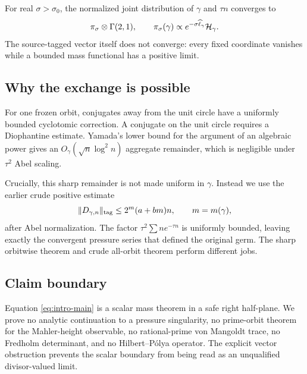 For real $\sigma>\sigma_0$, the normalized joint distribution of $\gamma$
and $\tau n$ converges to
\[
 \pi_\sigma\otimes\Gamma(2,1),
 \qquad
 \pi_\sigma(\gamma)
 \propto e^{-\sigma\widehat\ell_\gamma}\mathcal H_\gamma.
\]
The source-tagged vector itself does not converge: every fixed coordinate
vanishes while a bounded mass functional has a positive limit.

\subsection{Why the exchange is possible}

For one frozen orbit, conjugates away from the unit circle have a uniformly
bounded cyclotomic correction.  A conjugate on the unit circle requires a
Diophantine estimate.  Yamada's lower bound for the argument of an
algebraic power \citep{Yamada2025} gives an
$O_\gamma(\sqrt n\log^2 n)$ aggregate remainder, which is negligible under
$\tau^2$ Abel scaling.

Crucially, this sharp remainder is not made uniform in $\gamma$.  Instead we
use the earlier crude positive estimate
\[
 \|D_{\gamma,n}\|_{\rm tag}\le 2^m(a+bm)n,
 \qquad m=m(\gamma),
\]
after Abel normalization.  The factor
$\tau^2\sum ne^{-\tau n}$ is uniformly bounded, leaving exactly the
convergent pressure series that defined the original germ.  The sharp
orbitwise theorem and crude all-orbit theorem perform different jobs.

\subsection{Claim boundary}

Equation \eqref{eq:intro-main} is a scalar mass theorem in a safe right
half-plane.  We prove no analytic continuation to a pressure singularity,
no prime-orbit theorem for the Mahler-height observable, no rational-prime
von Mangoldt trace, no Fredholm determinant, and no Hilbert--P\'olya
operator.  The explicit vector obstruction prevents the scalar boundary
from being read as an unqualified divisor-valued limit.
